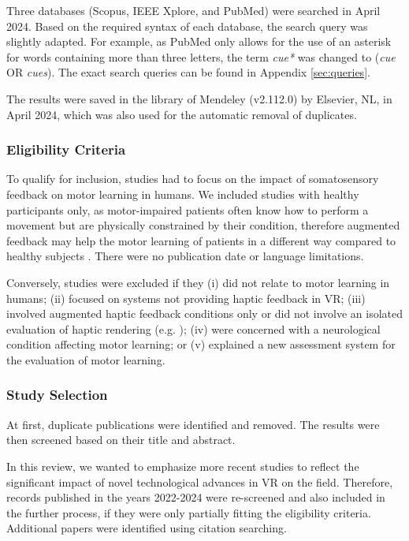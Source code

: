 Three databases (Scopus, IEEE Xplore, and PubMed) were searched in April 2024. Based on the required syntax of each database, the search query was slightly adapted. For example, as PubMed only allows for the use of an asterisk for words containing more than three letters, the term \textit{cue*} was changed to (\textit{cue} OR \textit{cues}). The exact search queries can be found in Appendix \ref{sec:queries}. 

The results were saved in the library of Mendeley (v2.112.0) by Elsevier, NL, in April 2024, which was also used for the automatic removal of duplicates. 

\subsubsection{Eligibility Criteria}
\label{sec:eligibility}
To qualify for inclusion, studies had to focus on the impact of somatosensory feedback on motor learning in humans. We included studies with healthy participants only, as motor-impaired patients often know how to perform a movement but are physically constrained by their condition, therefore augmented feedback may help the motor learning of patients in a different way compared to healthy subjects \cite{Sigrist2013AugmentedReview}. There were no publication date or language limitations.

Conversely, studies were excluded if they (i) did not relate to motor learning in humans; (ii) focused on systems not providing haptic feedback in VR; (iii) involved augmented haptic feedback conditions only or did not involve an isolated evaluation of haptic rendering (e.g. \cite{Caccianiga2021, LeeH2014}); (iv) were concerned with a neurological condition affecting motor learning; or (v) explained a new assessment system for the evaluation of motor learning.

\subsubsection{Study Selection}
At first, duplicate publications were identified and removed. The results were then screened based on their title and abstract. 

In this review, we wanted to emphasize more recent studies to reflect the significant impact of novel technological advances in VR on the field. Therefore, records published in the years 2022-2024 were re-screened and also included in the further process, if they were only partially fitting the eligibility criteria. Additional papers were identified using citation searching.

